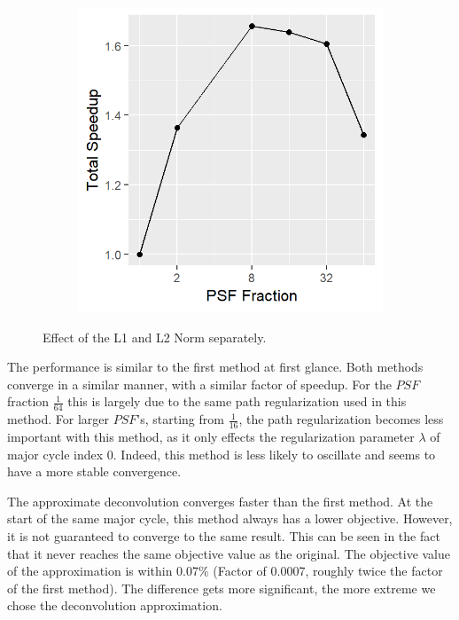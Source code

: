 \begin{figure}[h]
\begin{subfigure}[b]{0.35\linewidth}
		\includegraphics[width=\linewidth]{./chapters/10.results/gradient/ApproxDeconv/speedup_total.png}
	\end{subfigure}
	
	\caption{Effect of the L1 and L2 Norm separately.}
	\label{results:gradients:aproxDeconv}
\end{figure}

The performance is similar to the first method at first glance. Both methods converge in a similar manner, with a similar factor of speedup. For the $PSF$ fraction $\frac{1}{64}$ this is largely due to the same path regularization used in this method. For larger $PSF$'s, starting from $\frac{1}{16}$, the path regularization becomes less important with this method, as it only effects the regularization parameter $\lambda$ of major cycle index 0. Indeed, this method is less likely to oscillate and seems to have a more stable convergence.

The approximate deconvolution converges faster than the first method. At the start of the same major cycle, this method always has a lower objective. However, it is not guaranteed to converge to the same result. This can be seen in the fact that it never reaches the same objective value as the original. The objective value of the approximation is within 0.07\% (Factor of 0.0007, roughly twice the factor of the first method). The difference gets more significant, the more extreme we chose the deconvolution approximation.


